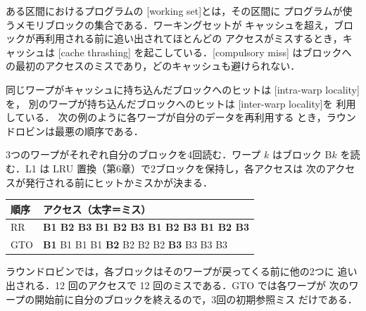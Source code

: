 \documentclass[../main.tex]{subfiles}
\begin{document}
\begin{definition}
  \label{def:l07-working-set}
  ある区間におけるプログラムの
  [working set]とは，その区間に
  プログラムが使うメモリブロックの集合である．ワーキングセットが
  キャッシュを超え，ブロックが再利用される前に追い出されてほとんどの
  アクセスがミスするとき，キャッシュは
  [cache thrashing]
  を起こしている．[compulsory miss]
  はブロックへの最初のアクセスのミスであり，どのキャッシュも避けられない．
\end{definition}

同じワープがキャッシュに持ち込んだブロックへのヒットは
[intra-warp locality]を，
別のワープが持ち込んだブロックへのヒットは
[inter-warp locality]を
利用している．
次の例のように各ワープが自分のデータを再利用する
とき，ラウンドロビンは最悪の順序である．

\begin{example}
  \label{ex:l07-thrashing}
  3つのワープがそれぞれ自分のブロックを4回読む．ワープ $k$ はブロック
  B$k$ を読む．L1 は LRU 置換（第6章）で2ブロックを保持し，各アクセスは
  次のアクセスが発行される前にヒットかミスかが決まる．
  \begin{center}
    \small
    \begin{tabular}{@{}ll@{}}
      \toprule
      順序 & アクセス（太字＝ミス） \\
      \midrule
      RR  & \textbf{B1 B2 B3 B1 B2 B3 B1 B2 B3 B1 B2 B3} \\
      GTO & \textbf{B1} B1 B1 B1 \textbf{B2} B2 B2 B2 \textbf{B3} B3 B3 B3 \\
      \bottomrule
    \end{tabular}
  \end{center}
  ラウンドロビンでは，各ブロックはそのワープが戻ってくる前に他の2つに
  追い出される．12 回のアクセスで 12 回のミスである．GTO では各ワープが
  次のワープの開始前に自分のブロックを終えるので，3回の初期参照ミス
  だけである．
\end{example}
\end{document}
